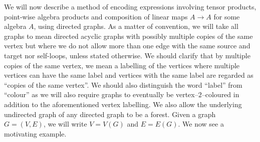 \documentclass{amsart}
\renewcommand{\to}[1][]{\stackrel{#1}{\longrightarrow}}
\numberwithin{thm}{section}
\theoremstyle{definition}
\begin{document}
We will now describe a method of encoding expressions involving tensor products,
point-wise algebra products and composition of linear maps $A \to A$ for some
algebra $A$, using directed graphs. As a matter of convention, we will take all
graphs to mean directed acyclic graphs with possibly multiple copies of the same
vertex but where we do not allow more than one edge
with the same source and target nor self-loops, unless stated otherwise.
We should clarify that by multiple copies of the same vertex, we mean a
labelling of the vertices where multiple vertices can have the same label and
vertices with the same label are regarded as ``copies of the same vertex''.
We should also distinguish the word ``label'' from ``colour'' as we will also
require graphs to eventually be vertex--$2$--coloured in addition to the
aforementioned vertex labelling.
We also allow the underlying
undirected graph of any directed graph to be a forest. Given a graph
$G = (V, E)$, we will write $V = V(G)$ and $E = E(G)$. We now see a motivating
example.
\end{document}
